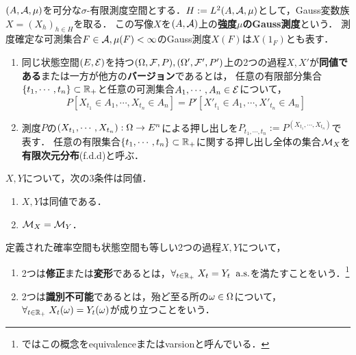\documentclass[uplatex,dvipdfmx]{jsreport}
\begin{document}
\begin{definition}
    $(A,\mathcal{A},\mu)$を可分な$\sigma$-有限測度空間とする．$H:=L^2(A,\mathcal{A},\mu)$として，Gauss変数族$X=(X_h)_{h\in H}$を取る．
    この写像$X$を$(A,\mathcal{A})$上の\textbf{強度$\mu$のGauss測度}という．
    測度確定な可測集合$F\in\mathcal{A},\mu(F)<\infty$のGauss測度$X(F)$は$X(1_F)$とも表す．
\end{definition}

\begin{definition}\mbox{}
    \begin{enumerate}
        \item 同じ状態空間$(E,\mathcal{E})$を持つ$(\Omega,\mathcal{F},P),(\Omega',\mathcal{F}',P')$上の2つの過程$X,X'$が\textbf{同値である}または一方が他方の\textbf{バージョン}であるとは，
        任意の有限部分集合$\{t_1,\cdots,t_n\}\subset\mathbb{R}_+$と任意の可測集合$A_1,\cdots,A_n\in\mathcal{E}$について，
        \[P[X_{t_1}\in A_1,\cdots,X_{t_n}\in A_n]=P'[X'_{t_1}\in A_1,\cdots,X'_{t_n}\in A_n]\]
        \item 測度$P$の$(X_{t_1},\cdots,X_{t_n}):\Omega\to E^n$による押し出しを$P_{t_1,\cdots,t_n}:=P^{(X_{t_1},\cdots,X_{t_n})}$で表す．
        任意の有限集合$\{t_1,\cdots,t_n\}\subset\mathbb{R}_+$に関する押し出し全体の集合$\mathcal{M}_X$を\textbf{有限次元分布}(f.d.d)と呼ぶ．
    \end{enumerate}
\end{definition}
\begin{lemma}[過程の同値性の特徴付け]
    $X,Y$について，次の3条件は同値．
    \begin{enumerate}
        \item $X,Y$は同値である．
        \item $\mathcal{M}_X=\mathcal{M}_Y$．
    \end{enumerate}
\end{lemma}

\begin{definition}
    定義された確率空間も状態空間も等しい2つの過程$X,Y$について，
    \begin{enumerate}
        \item 2つは\textbf{修正}または\textbf{変形}であるとは，$\forall_{t\in\mathbb{R}_+}\;X_t=Y_t\;\;\mathrm{a.s.}$を満たすことをいう．\footnote{\cite{Nualart}ではこの概念をequivalenceまたはvarsionと呼んでいる．}
        \item 2つは\textbf{識別不可能}であるとは，殆ど至る所の$\omega\in\Omega$について，$\forall_{t\in\mathbb{R}_+}\;X_t(\omega)=Y_t(\omega)$が成り立つことをいう．
    \end{enumerate}
\end{definition}
\end{document}
